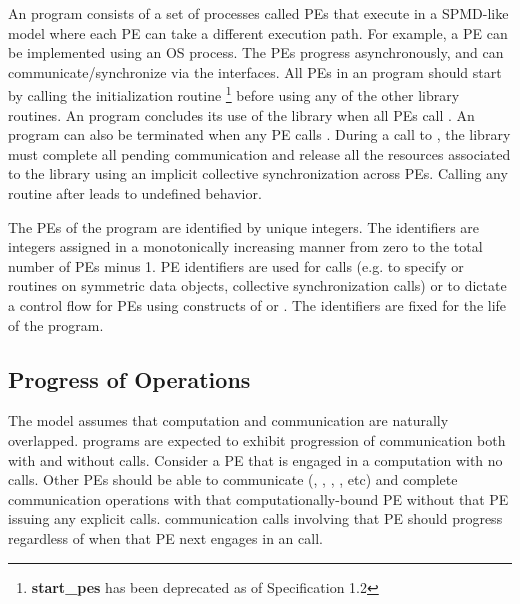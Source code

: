 An \openshmem program consists of a set of \openshmem processes called \acp{PE}
 that execute in a \ac{SPMD}-like model where each \ac{PE} can take a different
execution path. For example, a \ac{PE} can be implemented using an OS
process.  The \acp{PE} progress asynchronously, and can communicate/synchronize
via the \openshmem interfaces.  All \acp{PE} in an \openshmem program should
start by calling the initialization routine  
\footnote{\textbf{start\_pes} has been deprecated as of Specification 1.2}
before using any of the other \openshmem library routines.  An \openshmem
program concludes its use of the \openshmem library when all \acp{PE} call
. An \openshmem program can also be terminated
when any \ac{PE} calls .
During a call to , the \openshmem library must
complete all pending communication and release all the resources associated to
the library using an implicit collective synchronization across PEs.
Calling any \openshmem routine after  leads to undefined
behavior.

The \acp{PE} of the \openshmem program are identified by unique integers.  The
identifiers are integers assigned in a monotonically increasing manner from zero
to the total number of \acp{PE} minus 1. \ac{PE} identifiers are used for
\openshmem calls (e.g. to specify  or  routines on symmetric
data objects, collective synchronization calls) or to dictate a control flow for
\acp{PE} using constructs of \Cstd or \Fortran. The identifiers are fixed for
the life of the \openshmem program.

\subsection{Progress of \openshmem Operations}\label{subsec:progress}

The \openshmem model assumes that computation and communication are naturally
overlapped. \openshmem programs are expected to exhibit progression of
communication both with and without \openshmem calls. Consider a \ac{PE} that is
engaged in a computation with no \openshmem calls. Other \acp{PE} should be able
to communicate (, , , , etc) and
complete communication operations with that computationally-bound \ac{PE}
without that \ac{PE} issuing any explicit \openshmem calls. \openshmem
communication calls involving that \ac{PE} should progress regardless of when
that \ac{PE} next engages in an \openshmem call.


